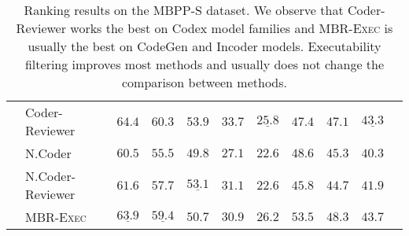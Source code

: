 \documentclass[nohyperref]{article}
\theoremstyle{plain}
\theoremstyle{definition}
\theoremstyle{remark}
\begin{document}
\begin{table*}[]
\begin{tabular}{l|lccccccccc}
    & Coder-Reviewer &     $\mathbf{64.4}$ &     $\mathbf{60.3}$ &     $\mathbf{53.9}$ &     $\mathbf{33.7}$ &  $\underline{25.8}$ &              $47.4$ &              $47.1$ &  $\underline{43.3}$ \\
\cmidrule{2-10}
    & N.Coder &              $60.5$ &              $55.5$ &              $49.8$ &              $27.1$ &              $22.6$ &              $48.6$ &              $45.3$ &              $40.3$ \\
    & N.Coder-Reviewer &              $61.6$ &              $57.7$ &  $\underline{53.1}$ &              $31.1$ &              $22.6$ &              $45.8$ &              $44.7$ &              $41.9$ \\
\cmidrule{2-10}
    & MBR-\textsc{Exec} &  $\underline{63.9}$ &  $\underline{59.4}$ &              $50.7$ &              $30.9$ &     $\mathbf{26.2}$ &     $\mathbf{53.5}$ &     $\mathbf{48.3}$ &     $\mathbf{43.7}$ \\
\bottomrule
\end{tabular}
 \caption{
Ranking results on the MBPP-S dataset. We observe that Coder-Reviewer works the best on Codex model families and MBR-\textsc{Exec} is usually the best on CodeGen and Incoder models. Executability filtering improves most methods and usually does not change the comparison between methods.
}
\label{tab:app_mbpps_exec}
\end{table*}
\end{document}

